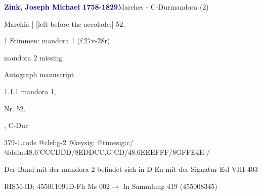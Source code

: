 \documentclass[twocolumn, 12pt]{book}
\begin{document}
\par \vspace{16pt} \textcolor{darkblue}{\textbf{Zink, Joseph Michael  1758-1829}}\hfillplus{\textbf{[379]}}\newline Marches - C-Dur\newline mandora (2)
\par \begin{itshape}[f.27v, at left:] Marchia | [left before the accolade:] 52.\end{itshape} 
\par \textcolor{darkblue}{}  1 Stimmen: mandora 1  (f.27v-28r)\newline \begin{small} mandora 2 missing\end{small} \newline Autograph manuscript
\par 1.1.1  mandora 1, \begin{itshape}Nr. 52.\end{itshape}, C-Dur  
\begin{filecontents*}{379-1.code}
@clef:g-2
@keysig:
@timesig:c/
@data:48.6'C{CC}D{DD}/{8EDDC}{C,G'CD}/48.6E{EE}F{FF}/{8GFFE}4E-/
\end{filecontents*}
\newline %
\par Der Band mit der mandora 2 befindet sich in D Eu mit der Signatur Esl VIII 403
\par RISM-ID: 455011091\newline D-Fh  Ms 002\newline $\rightarrow$ In Sammlung 419 (455008345)
      
\end{document}
